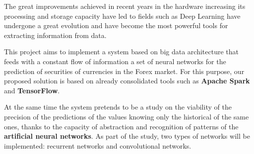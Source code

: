 
The great improvements achieved in recent years in the hardware increasing its processing and storage capacity have led to fields such as Deep Learning have undergone a great evolution and have become the most powerful tools for extracting information from data.

This project aims to implement a system based on big data architecture that feeds with a constant flow of information a set of neural networks for the prediction of securities of currencies in the Forex market. For this purpose, our proposed solution is based on already consolidated tools such as \textbf{Apache Spark} and \textbf{TensorFlow}.

At the same time the system pretends to be a study on the viability of the precision of the predictions of the values knowing only the historical of the same ones, thanks to the capacity of abstraction and recognition of patterns of the \textbf{artificial neural networks}. As part of the study, two types of networks will be implemented: recurrent networks and convolutional networks.

